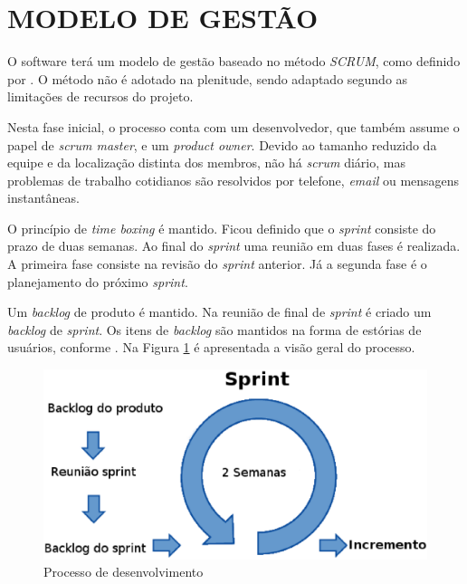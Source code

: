 \section[MODELO DE GESTÃO]{MODELO DE GESTÃO}
O software terá um modelo de gestão baseado no método \emph{SCRUM}, como definido por \cite{schwaber2002}.
O método não é adotado na plenitude, sendo adaptado segundo as limitações de recursos do projeto.

Nesta fase inicial, o processo conta com um desenvolvedor, que também assume o papel de \emph{scrum master}, e um \emph{product owner}. 
Devido ao tamanho reduzido da equipe e da localização distinta dos membros, não há \emph{scrum} diário, mas problemas de trabalho cotidianos são resolvidos por telefone, \emph{email} ou mensagens instantâneas. 

O princípio de \emph{time boxing} é mantido. Ficou definido que o \emph{sprint} consiste do prazo de duas semanas. Ao final do \emph{sprint} uma reunião em duas fases é realizada. A primeira fase consiste na revisão do \emph{sprint} anterior. Já a segunda fase é o planejamento do próximo \emph{sprint}.

Um \emph{backlog} de produto é mantido. Na reunião de final de \emph{sprint} é criado um \emph{backlog} de \emph{sprint}. 
Os itens de \emph{backlog} são mantidos na forma de estórias de usuários, conforme \cite{cohn2004}.
Na Figura \ref{scrum_projeto} é apresentada a visão geral do processo.

\begin{figure}[ht]
	\centering
	\includegraphics[width=15cm]{figuras/scrum_projeto.eps}
	\caption{Processo de desenvolvimento}
	\label{scrum_projeto}
\end{figure}
